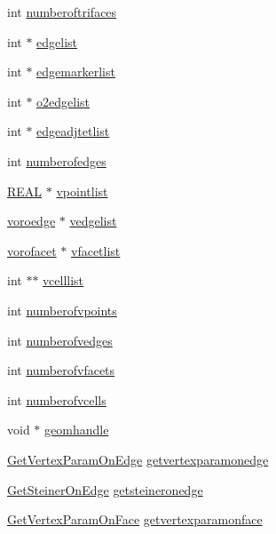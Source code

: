 \begin{DoxyCompactItemize}
\item 
int \hyperlink{classtetgenio_aba0186083c61eb48fca7e80b4a3158f2}{numberoftrifaces}
\item 
int $\ast$ \hyperlink{classtetgenio_ad4910159c1aa4dad3e66b24d8816f76c}{edgelist}
\item 
int $\ast$ \hyperlink{classtetgenio_a35d12dcf3f3bb8e9304617da0e36d13f}{edgemarkerlist}
\item 
int $\ast$ \hyperlink{classtetgenio_a0bf45168ac1af3d5b5ccaf8fe4cb13e3}{o2edgelist}
\item 
int $\ast$ \hyperlink{classtetgenio_ac1b0d2422e6da1fb08246f61e39bb352}{edgeadjtetlist}
\item 
int \hyperlink{classtetgenio_a5f2c3193ef485cbbf53416538c9df73c}{numberofedges}
\item 
\hyperlink{tetgen_8h_a4b654506f18b8bfd61ad2a29a7e38c25}{R\+E\+AL} $\ast$ \hyperlink{classtetgenio_afecb51e1302b9006eba50bc2a995b372}{vpointlist}
\item 
\hyperlink{structtetgenio_1_1voroedge}{voroedge} $\ast$ \hyperlink{classtetgenio_ab9abf598dc77ffd6754cc087f32bcc98}{vedgelist}
\item 
\hyperlink{structtetgenio_1_1vorofacet}{vorofacet} $\ast$ \hyperlink{classtetgenio_a14c253eb433eecf874ab4b6fba68c683}{vfacetlist}
\item 
int $\ast$$\ast$ \hyperlink{classtetgenio_ac39235a7d29d7786e8471e9c3b88d292}{vcelllist}
\item 
int \hyperlink{classtetgenio_a418782ab7caedfd9c316905996400553}{numberofvpoints}
\item 
int \hyperlink{classtetgenio_a4c8ba7851351b7f70e3ef837e2900f74}{numberofvedges}
\item 
int \hyperlink{classtetgenio_a054e5d022a3e6c6cb490975487390bba}{numberofvfacets}
\item 
int \hyperlink{classtetgenio_afbc917d5c352817d0668170f71bb8404}{numberofvcells}
\item 
void $\ast$ \hyperlink{classtetgenio_a7d3bb20b8973217ce08614dabb3b7d2a}{geomhandle}
\item 
\hyperlink{classtetgenio_a9b66695edca7918733cccf3e44c95e3d}{Get\+Vertex\+Param\+On\+Edge} \hyperlink{classtetgenio_a7278480edf09861f713ad92e589221f2}{getvertexparamonedge}
\item 
\hyperlink{classtetgenio_a1c16b3a4c3d5a0166f989fa62a0ea575}{Get\+Steiner\+On\+Edge} \hyperlink{classtetgenio_a08ab06b4e0af5a4911a0d5ae04fe08e3}{getsteineronedge}
\item 
\hyperlink{classtetgenio_a331721b37f6937630548cb659642f926}{Get\+Vertex\+Param\+On\+Face} \hyperlink{classtetgenio_abe5875cae7c00d505062e62e52e9a8dd}{getvertexparamonface}
$$
\end{DoxyCompactItemize}
